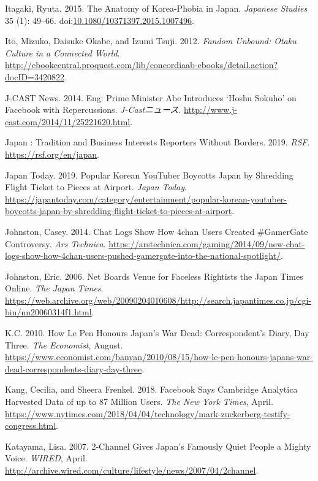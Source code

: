 \documentclass[10pt,british,A4paper,,openany]{memoir}
\begin{document}
\hypertarget{ref-itagaki_anatomy_2015}{}
Itagaki, Ryuta. 2015. The Anatomy of Korea-Phobia in Japan.
\emph{Japanese Studies} 35 (1): 49--66.
doi:\href{https://doi.org/10.1080/10371397.2015.1007496}{10.1080/10371397.2015.1007496}.

\hypertarget{ref-ito_fandom_2012}{}
Itō, Mizuko, Daisuke Okabe, and Izumi Tsuji. 2012. \emph{Fandom Unbound:
Otaku Culture in a Connected World}.
\url{http://ebookcentral.proquest.com/lib/concordiaab-ebooks/detail.action?docID=3420822}.

\hypertarget{ref-j-cast_news_eng:_2014}{}
J-CAST News. 2014. Eng: Prime Minister Abe Introduces `Hoshu Sokuho' on
Facebook with Repercussions. \emph{J-Castニュース}.
\url{http://www.j-cast.com/2014/11/25221620.html}.

\hypertarget{ref-noauthor_japan_2019}{}
Japan : Tradition and Business Interests Reporters Without Borders.
2019. \emph{RSF}. \url{https://rsf.org/en/japan}.

\hypertarget{ref-japan_today_popular_2019}{}
Japan Today. 2019. Popular Korean YouTuber Boycotts Japan by Shredding
Flight Ticket to Pieces at Airport. \emph{Japan Today}.
\url{https://japantoday.com/category/entertainment/popular-korean-youtuber-boycotts-japan-by-shredding-flight-ticket-to-pieces-at-airport}.

\hypertarget{ref-johnston_chat_2014}{}
Johnston, Casey. 2014. Chat Logs Show How 4chan Users Created
\#GamerGate Controversy. \emph{Ars Technica}.
\url{https://arstechnica.com/gaming/2014/09/new-chat-logs-show-how-4chan-users-pushed-gamergate-into-the-national-spotlight/}.

\hypertarget{ref-johnston_net_2006}{}
Johnston, Eric. 2006. Net Boards Venue for Faceless Rightists the Japan
Times Online. \emph{The Japan Times}.
\url{https://web.archive.org/web/20090204010608/http://search.japantimes.co.jp/cgi-bin/nn20060314f1.html}.

\hypertarget{ref-k.c._how_2010}{}
K.C. 2010. How Le Pen Honours Japan's War Dead: Correspondent's Diary,
Day Three. \emph{The Economist}, August.
\url{https://www.economist.com/banyan/2010/08/15/how-le-pen-honours-japans-war-dead-correspondents-diary-day-three}.

\hypertarget{ref-kang_facebook_2018}{}
Kang, Cecilia, and Sheera Frenkel. 2018. Facebook Says Cambridge
Analytica Harvested Data of up to 87 Million Users. \emph{The New York
Times}, April.
\url{https://www.nytimes.com/2018/04/04/technology/mark-zuckerberg-testify-congress.html}.

\hypertarget{ref-katayama_2-channel_2007}{}
Katayama, Lisa. 2007. 2-Channel Gives Japan's Famously Quiet People a
Mighty Voice. \emph{WIRED}, April.
\url{http://archive.wired.com/culture/lifestyle/news/2007/04/2channel}.
\end{document}
